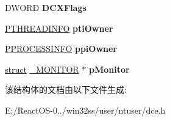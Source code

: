 \begin{DoxyCompactItemize}
\mbox{\label{structtag_d_c_e_a20d602e2584192deb30fb28342f90555}} 
D\+W\+O\+RD {\bfseries D\+C\+X\+Flags}
\item 
\mbox{\label{structtag_d_c_e_ad6456e40140fbec793585bcbfe499c48}} 
\hyperlink{struct___t_h_r_e_a_d_i_n_f_o}{P\+T\+H\+R\+E\+A\+D\+I\+N\+FO} {\bfseries pti\+Owner}
\item 
\mbox{\label{structtag_d_c_e_a9eaf72ef35b1ce850f03cfca57aaebd1}} 
\hyperlink{struct___p_r_o_c_e_s_s_i_n_f_o}{P\+P\+R\+O\+C\+E\+S\+S\+I\+N\+FO} {\bfseries ppi\+Owner}
\item 
\mbox{\label{structtag_d_c_e_a24cada00e142d89b73295e92b3fa76d2}} 
\hyperlink{interfacestruct}{struct} \hyperlink{struct___m_o_n_i_t_o_r}{\+\_\+\+M\+O\+N\+I\+T\+OR} $\ast$ {\bfseries p\+Monitor}
\end{DoxyCompactItemize}


该结构体的文档由以下文件生成\+:\begin{DoxyCompactItemize}
\item 
E\+:/\+React\+O\+S-\/0../win32ss/user/ntuser/dce.\+h\end{DoxyCompactItemize}
